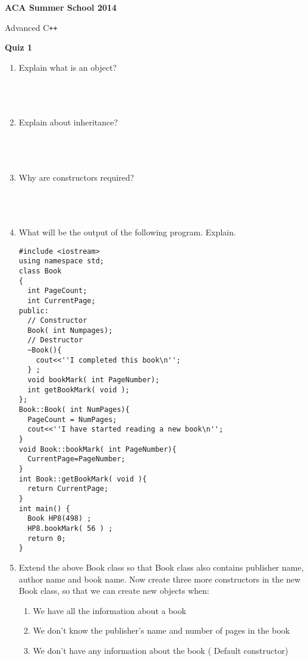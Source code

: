 \documentclass[12pt]{article}
\date{ }
\begin{document}
\begin{center}
\textbf{\LARGE{ACA Summer School 2014}}\vspace{.5cm}

\large{Advanced C\texttt{++}} \\ \vspace{.5cm}

\textbf{\large{Quiz 1}}\\
\end{center}

\begin{enumerate}
  \item Explain what is an object?\\\\\\\\
  \item Explain about inheritance?\\\\\\\\
  \item Why are constructors required?\\\\\\\\
  \item What will be the output of the following program. Explain.
    \begin{lstlisting}
#include <iostream>
using namespace std;
class Book
{
  int PageCount;
  int CurrentPage;
public:
  // Constructor
  Book( int Numpages);
  // Destructor
  ~Book(){
    cout<<''I completed this book\n'';
  } ;
  void bookMark( int PageNumber);
  int getBookMark( void );
};
Book::Book( int NumPages){
  PageCount = NumPages;
  cout<<''I have started reading a new book\n'';
}
void Book::bookMark( int PageNumber){
  CurrentPage=PageNumber;
}
int Book::getBookMark( void ){
  return CurrentPage;
}
int main() {
  Book HP8(498) ;
  HP8.bookMark( 56 ) ;
  return 0;
}
    \end{lstlisting}\vspace*{100mm}
  \item Extend the above Book class so that Book class also contains publisher name, author name and book name. Now create three more constructors in the new Book class, so that we can create new objects when:
    \begin{enumerate}
    \item We have all the information about a book
    \item We don't know the publisher's name and number of pages in the book
    \item We don't have any information about the book ( Default constructor)
    \end{enumerate}\vspace*{100mm}


\end{enumerate}
\end{document}
